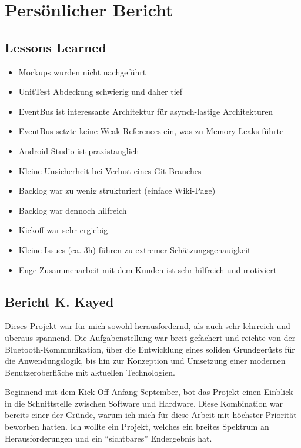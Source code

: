 \section{Persönlicher Bericht}
\label{Persönlicher Bericht}

\subsection{Lessons Learned}
\label{sub:lessons_learned}

\begin{itemize}
\item{Mockups wurden nicht nachgeführt}
\item{UnitTest Abdeckung schwierig und daher tief}
\item{EventBus ist interessante Architektur für asynch-lastige Architekturen}
\item{EventBus setzte keine Weak-References ein, was zu Memory Leaks führte}
\item{Android Studio ist praxistauglich}
\item{Kleine Unsicherheit bei Verlust eines Git-Branches}
\item{Backlog war zu wenig strukturiert (einface Wiki-Page)}
\item{Backlog war dennoch hilfreich}
\item{Kickoff war sehr ergiebig}
\item{Kleine Issues (ca. 3h) führen zu extremer Schätzungsgenauigkeit}
\item{Enge Zusammenarbeit mit dem Kunden ist sehr hilfreich und motiviert}
\end{itemize}

\subsection{Bericht K. Kayed}

Dieses Projekt war für mich sowohl herausfordernd, als auch sehr lehrreich und überaus spannend. Die Aufgabenstellung war breit gefächert und reichte von der Bluetooth-Kommunikation, über die Entwicklung eines soliden Grundgerüsts für die Anwendungslogik, bis hin zur Konzeption und Umsetzung einer modernen Benutzeroberfläche mit aktuellen Technologien.

Beginnend mit dem Kick-Off Anfang September, bot das Projekt einen Einblick in die Schnittstelle zwischen Software und Hardware. Diese Kombination war bereits einer der Gründe, warum ich mich für diese Arbeit mit höchster Priorität beworben hatten. Ich wollte ein Projekt, welches ein breites Spektrum an Herausforderungen und ein \enquote{sichtbares} Endergebnis hat.

